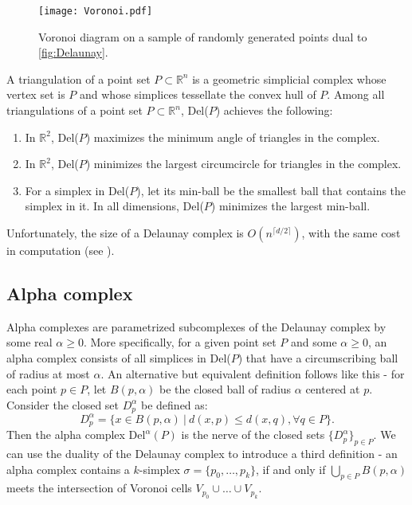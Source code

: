 \begin{figure}[h!]
  \centering
  \texttt{[image: Voronoi.pdf]}
  \caption{Voronoi diagram on a sample of randomly generated points dual to \ref{fig:Delaunay}.}
  \label{fig:Voronoi}
\end{figure}

\begin{theorem}
  A triangulation of a point set $P \subset \mathbb{R}^{n}$ is a geometric simplicial complex whose vertex set is $P$ and whose simplices tessellate the convex hull of $P$. Among all triangulations of a point set $P \subset \mathbb{R}^{n}$, Del($P$) achieves the following:
  \begin{enumerate}
  \item In $\mathbb{R}^{2}$, Del($P$) maximizes the minimum angle of triangles in the complex.
  \item In $\mathbb{R}^{2}$, Del($P$) minimizes the largest circumcircle for triangles in the complex.
  \item For a simplex in Del($P$), let its min-ball be the smallest ball that contains the simplex in it. In all dimensions, Del($P$) minimizes the largest min-ball.
  \end{enumerate}
\end{theorem}
Unfortunately, the size of a Delaunay complex is $O(n^{\lceil d/2 \rceil})$, with the same cost in computation (see \cite{chazelle1993optimal}).

\subsection{Alpha complex}
Alpha complexes are parametrized subcomplexes of the Delaunay complex by some real $\alpha \geq 0$. More specifically, for a given point set $P$ and some $\alpha \geq 0$, an alpha complex consists of all simplices in Del($P$) that have a circumscribing ball of radius at most $\alpha$. An alternative but equivalent definition follows like this - for each point $p \in P$, let $B(p,\alpha)$ be the closed ball of radius $\alpha$ centered at $p$. Consider the closed set $D^{\alpha}_{p}$ be defined as:
\begin{equation*}
  D^{\alpha}_{p} = \{x \in B(p,\alpha) \: \vert \: d(x,p) \leq d(x,q), \forall q \in P\}.
\end{equation*}
Then the alpha complex $\text{Del}^{\alpha}(P)$ is the nerve of the closed sets $\{D^{\alpha}_{p}\}_{p \in P}$.
We can use the duality of the Delaunay complex to introduce a third definition - an alpha complex contains a $k$-simplex $\sigma = \{p_{0}, \ldots, p_{k}\}$, if and only if $\bigcup_{p \in P}B(p,\alpha)$ meets the intersection of Voronoi cells $V_{p_{0}} \cup \ldots \cup V_{p_{k}}$.

